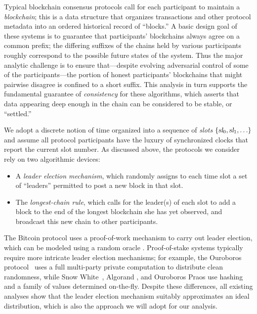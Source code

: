 
Typical blockchain consensus protocols
call for each participant to maintain a \emph{blockchain}; this is a
data structure that organizes transactions and other protocol metadata
into an ordered historical record of ``blocks.'' A basic design goal
of these systems is to guarantee that participants' blockchains always
agree on a common prefix; the differing suffixes of the chains held
by various participants roughly correspond to the possible future
states of the system. Thus the major analytic challenge is to ensure
that---despite evolving adversarial control of some of the
participants---the portion of honest participants' blockchains that
might pairwise disagree is confined to a short suffix. This analysis
in turn supports the fundamental guarantee of \emph{consistency}
for these algorithms, which asserts that data appearing
deep enough in the chain can be considered to be stable, or ``settled.'' 


\begin{sloppypar}
  We adopt a discrete notion of time organized into a sequence of
  \emph{slots} $\{\textsl{sl}_0, \textsl{sl}_1, \ldots\}$ and assume all protocol
  participants have the luxury of synchronized clocks that report the
  current slot number. As discussed above, the protocols we consider
  rely on two algorithmic devices:
\begin{itemize}
\item A \emph{leader election mechanism}, which randomly assigns to each time
  slot a set of ``leaders'' permitted to post a new block in that slot.
\item The \emph{longest-chain rule}, which calls for the leader(s) of
  each slot to add a block to the end of the longest blockchain she
  has yet observed, and broadcast this new chain to other participants.
\end{itemize}
The Bitcoin protocol uses a proof-of-work mechanism to carry out
leader election, which can be modeled using a random oracle
\cite{DBLP:conf/eurocrypt/GarayKL15,DBLP:conf/eurocrypt/PassSS17,DBLP:conf/crypto/GarayKL17}.
Proof-of-stake systems typically require more intricate leader
election mechanisms; for example, the Ouroboros
protocol~\cite{KRDO17} uses a full multi-party private computation to distribute clean randomness,
while Snow White~\cite{DBLP:journals/iacr/BentovPS16a}, Algorand
\cite{DBLP:journals/corr/Micali16}, and Ouroboros Praos
\cite{DBLP:conf/eurocrypt/DavidGKR18} use hashing and a family of
values determined on-the-fly. Despite these differences, all existing
analyses show that the leader election mechanism suitably approximates
an ideal distribution, which is also the approach we will adopt for our analysis.

\end{sloppypar}

